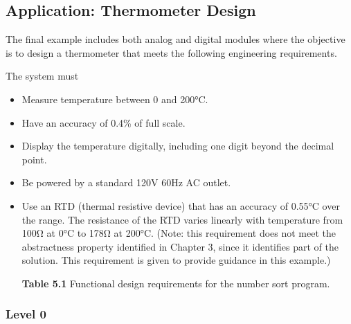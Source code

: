 \subsection{Application: Thermometer
Design}\label{application-thermometer-design}

The final example includes both analog and digital modules where the
objective is to design a thermometer that meets the following
engineering requirements.

The system must

\begin{itemize}
\item
  Measure temperature between 0 and 200°C.
\item
  Have an accuracy of 0.4\% of full scale.
\item
  Display the temperature digitally, including one digit beyond the
  decimal point.
\item
  Be powered by a standard 120V 60Hz AC outlet.
\item
  Use an RTD (thermal resistive device) that has an accuracy of 0.55°C
  over the range. The resistance of the RTD varies linearly with
  temperature from 100Ω at 0°C to 178Ω at 200°C. (Note: this requirement
  does not meet the abstractness property identified in Chapter 3, since
  it identifies part of the solution. This requirement is given to
  provide guidance in this example.)

  \textbf{Table 5.1} Functional design requirements for the number sort
  program.
\end{itemize}

\subsubsection*{\texorpdfstring{\hfill\break
Level 0}{ Level 0}}\label{level-0-2}

